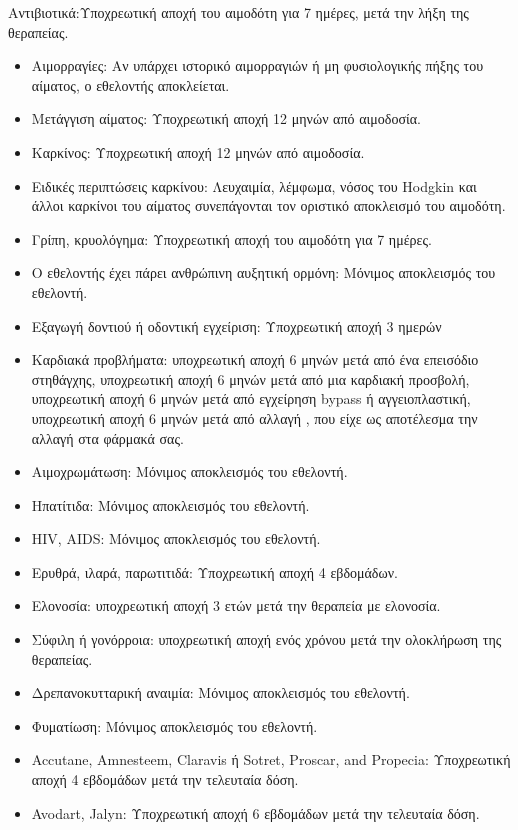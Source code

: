 		
		Αντιβιοτικά:Υποχρεωτική αποχή του αιμοδότη για 7 ημέρες, μετά την λήξη της θεραπείας.
		
		\begin{itemize}
	
		\item Αιμορραγίες: Αν υπάρχει ιστορικό αιμορραγιών ή μη φυσιολογικής πήξης του αίματος, ο εθελοντής αποκλείεται.
		\item Μετάγγιση αίματος: Υποχρεωτική αποχή 12 μηνών από αιμοδοσία.
		\item Καρκίνος: Υποχρεωτική αποχή 12 μηνών από αιμοδοσία.
		\item Ειδικές περιπτώσεις καρκίνου: Λευχαιμία, λέμφωμα, νόσος του Hodgkin και άλλοι καρκίνοι του αίματος συνεπάγονται τον οριστικό αποκλεισμό του αιμοδότη. 
		\item Γρίπη, κρυολόγημα: Υποχρεωτική αποχή του αιμοδότη για 7 ημέρες.
		\item Ο εθελοντής έχει πάρει ανθρώπινη αυξητική ορμόνη: Μόνιμος αποκλεισμός του εθελοντή.
		\item Εξαγωγή δοντιού ή οδοντική εγχείριση: Υποχρεωτική αποχή 3 ημερών
		\item Καρδιακά προβλήματα: υποχρεωτική αποχή 6 μηνών μετά από ένα επεισόδιο στηθάγχης, υποχρεωτική αποχή 6 μηνών μετά από μια καρδιακή προσβολή, υποχρεωτική αποχή 6 μηνών μετά από εγχείρηση bypass ή αγγειοπλαστική, υποχρεωτική αποχή 6 μηνών μετά από αλλαγή , που είχε ως αποτέλεσμα την αλλαγή στα φάρμακά σας.
		\item Aιμοχρωμάτωση: Μόνιμος αποκλεισμός του εθελοντή. 
		\item Ηπατίτιδα:  Μόνιμος αποκλεισμός του εθελοντή. 
		\item HIV, AIDS:  Μόνιμος αποκλεισμός του εθελοντή. 
		\item Ερυθρά, ιλαρά, παρωτιτιδά: Υποχρεωτική αποχή 4 εβδομάδων.
		\item Ελονοσία: υποχρεωτική αποχή 3 ετών μετά την θεραπεία με ελονοσία.
		\item Σύφιλη ή γονόρροια: υποχρεωτική αποχή ενός χρόνου μετά την ολοκλήρωση της θεραπείας.
		\item Δρεπανοκυτταρική αναιμία: Μόνιμος αποκλεισμός του εθελοντή. 
		\item Φυματίωση: Μόνιμος αποκλεισμός του εθελοντή. 
		\item Accutane, Amnesteem, Claravis ή Sotret, Proscar, and Propecia: Υποχρεωτική αποχή 4 εβδομάδων μετά την τελευταία δόση.
		\item Avodart, Jalyn: Υποχρεωτική αποχή 6 εβδομάδων μετά την τελευταία δόση.

\end{itemize}
